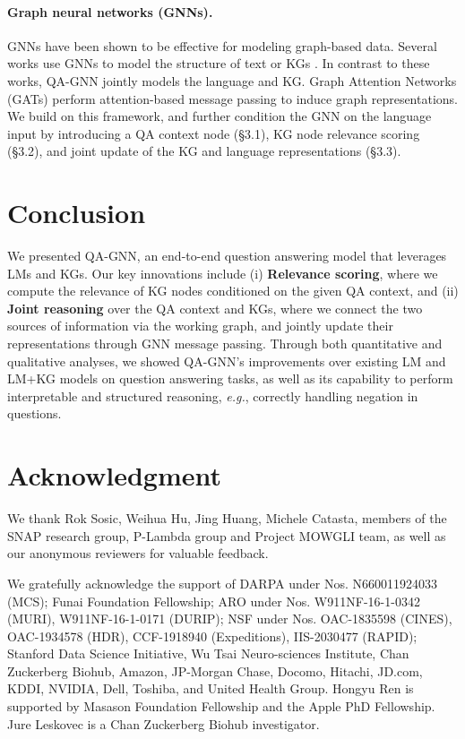 \documentclass[11pt]{article}
\newcommand{\eg}{\textit{e.g.}}
\newcommand{\methodname}{QA-GNN\xspace}
\begin{document}
\paragraph{Graph neural networks (GNNs).}
GNNs have been shown to be effective for modeling graph-based data.
Several works use GNNs to model the structure of text \cite{yasunaga2017graph,zhang2018graph,yasunaga2020repair} or KGs \cite{Wang2020Entity}. In contrast to these works, \methodname jointly models the language and KG.
Graph Attention Networks (GATs) \cite{velikovi2017graph} perform attention-based message passing to induce graph representations. 
We build on this framework, and further {condition} the GNN on the language input by introducing a QA context node (\S 3.1), KG node relevance scoring (\S 3.2), and joint update of the KG and language representations (\S 3.3). 

 \section{Conclusion}\label{sec:conclusion}
We presented \methodname, an end-to-end question answering model that leverages LMs and KGs. 
Our key innovations include (i) \textbf{Relevance scoring}, where we compute the relevance of KG nodes conditioned on the given QA context,
and (ii) \textbf{Joint reasoning} over the QA context and KGs, where we connect the two sources of information via the working graph, and jointly update their representations through GNN message passing.
Through both quantitative and qualitative analyses, we showed \methodname's improvements over existing LM and LM+KG models on question answering tasks, as well as its capability to perform interpretable and structured reasoning, \eg, correctly handling negation in questions.

 
\section*{Acknowledgment}
We thank Rok Sosic, Weihua Hu, Jing Huang, Michele Catasta, members of the SNAP research group, P-Lambda group and Project MOWGLI team, as well as our anonymous reviewers for valuable feedback.

We gratefully acknowledge the support of DARPA under Nos. N660011924033 (MCS); Funai Foundation Fellowship; ARO under Nos. W911NF-16-1-0342 (MURI), W911NF-16-1-0171 (DURIP); NSF under Nos. OAC-1835598 (CINES), OAC-1934578 (HDR), CCF-1918940 (Expeditions), IIS-2030477 (RAPID); Stanford Data Science Initiative, Wu Tsai Neuro-sciences Institute, Chan Zuckerberg Biohub, Amazon, JP-Morgan Chase, Docomo, Hitachi, JD.com, KDDI, NVIDIA, Dell, Toshiba, and United Health Group. Hongyu Ren is supported by Masason Foundation Fellowship and the Apple PhD Fellowship. Jure Leskovec is a Chan Zuckerberg Biohub investigator. 
\end{document}
